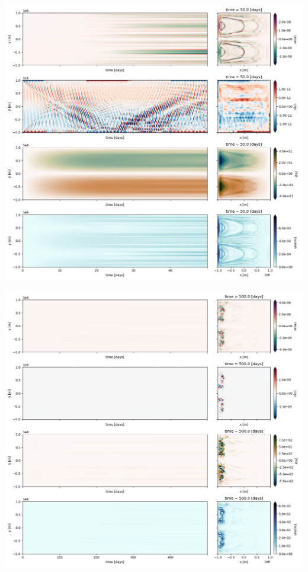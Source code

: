 \documentclass[10pt]{report}
\numberwithin{equation}{section}
\begin{document}
\begin{center}
\includegraphics[width=.9\linewidth]{figures/tests/2023-08-14_hovmoller1_t=50days.png}
\end{center}
\begin{center}
\includegraphics[width=.9\linewidth]{figures/tests/2023-08-14_hovmoller1_t=500days.png}
\end{center}
\end{document}
